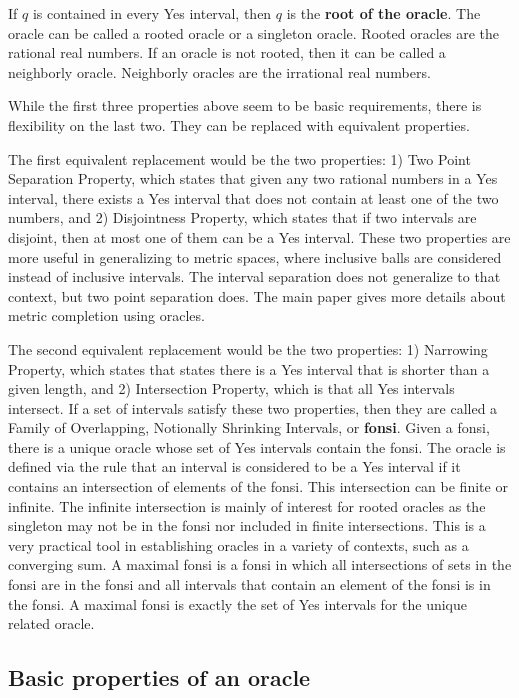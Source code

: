 \documentclass[12pt]{article}
\theoremstyle{remark}
\begin{document}
If $q$ is contained in every Yes interval, then $q$ is the \textbf{root of the oracle}.  The oracle can be called a rooted oracle or a singleton oracle. Rooted oracles are the rational real numbers. If an oracle is not rooted, then it can be called a neighborly oracle. Neighborly oracles are the irrational real numbers. 

While the first three properties above seem to be basic requirements, there is flexibility on the last two. They can be replaced with equivalent properties.

The first equivalent replacement would be the two properties: 1) Two Point Separation Property, which states that given any two rational numbers in a Yes interval, there exists a Yes interval that does not contain at least one of the two numbers, and 2) Disjointness Property, which states that if two intervals are disjoint, then at most one of them can be a Yes interval. These two properties are more useful in generalizing to metric spaces, where inclusive balls are considered instead of inclusive intervals. The interval separation does not generalize to that context, but two point separation does. The main paper gives more details about metric completion using oracles. 

The second equivalent replacement would be the two properties: 1) Narrowing Property, which states that states there is a Yes interval that is shorter than a given length, and 2) Intersection Property, which is that all Yes intervals intersect. If a set of intervals satisfy these two properties, then they are called a Family of Overlapping, Notionally Shrinking Intervals, or \textbf{fonsi}. Given a fonsi, there is a unique oracle whose set of Yes intervals contain the fonsi. The oracle is defined via the rule that an interval is considered to be a Yes interval if it contains an intersection of elements of the fonsi. This intersection can be finite or infinite. The infinite intersection is mainly of interest for rooted oracles as the singleton may not be in the fonsi nor included in finite intersections. This is a very practical tool in establishing oracles in a variety of contexts, such as a converging sum. A maximal fonsi is a fonsi in which all intersections of sets in the fonsi are in the fonsi and all intervals that contain an element of the fonsi is in the fonsi. A maximal fonsi is exactly the set of Yes intervals for the unique related oracle. 


\subsection{Basic properties of an oracle}
\end{document}
